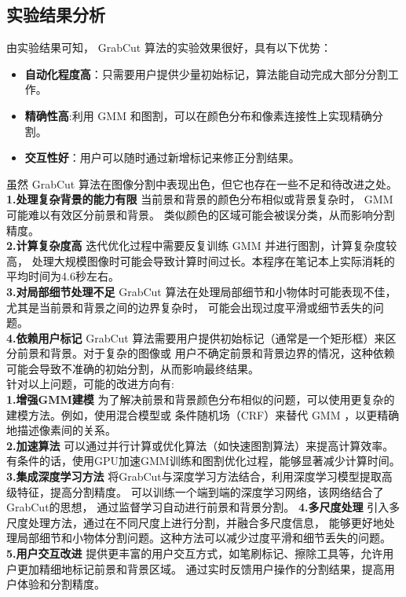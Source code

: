 \documentclass[12pt,a4paper]{article}
\begin{document}
\begin{CJK}{UTF8}{gbsn}
\begin{sloppypar}
\subsection{实验结果分析}
由实验结果可知， GrabCut 算法的实验效果很好，具有以下优势：
\begin{itemize}
    \item \textbf{自动化程度高}：只需要用户提供少量初始标记，算法能自动完成大部分分割工作。
    \item \textbf{精确性高}:利用 GMM 和图割，可以在颜色分布和像素连接性上实现精确分割。
    \item \textbf{交互性好}：用户可以随时通过新增标记来修正分割结果。
\end{itemize}
虽然 GrabCut 算法在图像分割中表现出色，但它也存在一些不足和待改进之处。\newline
\textbf{1.处理复杂背景的能力有限}\newline
当前景和背景的颜色分布相似或背景复杂时， GMM 可能难以有效区分前景和背景。
类似颜色的区域可能会被误分类，从而影响分割精度。\\
\textbf{2.计算复杂度高}\newline
迭代优化过程中需要反复训练 GMM 并进行图割，计算复杂度较高，
处理大规模图像时可能会导致计算时间过长。本程序在笔记本上实际消耗的平均时间为4.6秒左右。\\
\textbf{3.对局部细节处理不足}\newline
GrabCut 算法在处理局部细节和小物体时可能表现不佳，尤其是当前景和背景之间的边界复杂时，
可能会出现过度平滑或细节丢失的问题。\\
\textbf{4.依赖用户标记}\newline
GrabCut 算法需要用户提供初始标记（通常是一个矩形框）来区分前景和背景。对于复杂的图像或
用户不确定前景和背景边界的情况，这种依赖可能会导致不准确的初始分割，从而影响最终结果。\\
针对以上问题，可能的改进方向有:\\
\textbf{1.增强GMM建模}\newline
为了解决前景和背景颜色分布相似的问题，可以使用更复杂的建模方法。例如，使用混合模型或
条件随机场（CRF）来替代 GMM ，以更精确地描述像素间的关系。\\
\textbf{2.加速算法}\newline
可以通过并行计算或优化算法（如快速图割算法）来提高计算效率。
有条件的话，使用GPU加速GMM训练和图割优化过程，能够显著减少计算时间。\\
\textbf{3.集成深度学习方法}\newline
将GrabCut与深度学习方法结合，利用深度学习模型提取高级特征，提高分割精度。
可以训练一个端到端的深度学习网络，该网络结合了GrabCut的思想，
通过监督学习自动进行前景和背景分割。
\textbf{4.多尺度处理}\newline
引入多尺度处理方法，通过在不同尺度上进行分割，并融合多尺度信息，
能够更好地处理局部细节和小物体分割问题。这种方法可以减少过度平滑和细节丢失的问题。\\
\textbf{5.用户交互改进}\newline
提供更丰富的用户交互方式，如笔刷标记、擦除工具等，允许用户更加精细地标记前景和背景区域。
通过实时反馈用户操作的分割结果，提高用户体验和分割精度。



\end{sloppypar}
\end{CJK}
\end{document}
